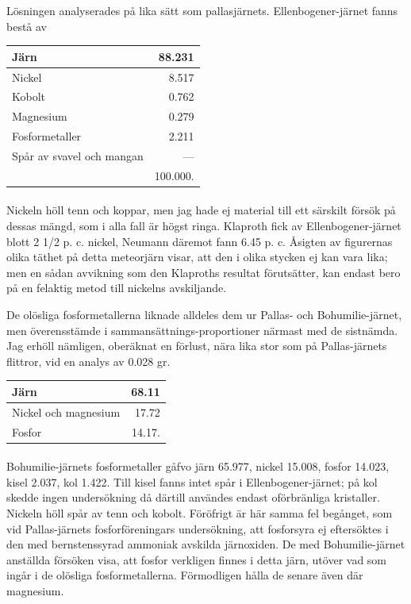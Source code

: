 \documentclass[a4paper, 12pt, oneside, swedish]{article}
\begin{document}
Lösningen analyserades på lika sätt som pallasjärnets. Ellenbogener-järnet fanns bestå av
\begin{table}[H]
    \centering\small
    \begin{tabular}{|l|r|}
    \hline
        Järn & 88.231 \\ \hline
        Nickel & 8.517 \\ \hline
        Kobolt & 0.762 \\ \hline
        Magnesium & 0.279 \\ \hline
        Fosformetaller & 2.211 \\ \hline
        Spår av svavel och mangan & --- \\ \hline
        ~ & 100.000. \\ \hline
    \end{tabular}
\end{table}
\paragraph{}
Nickeln höll tenn och koppar, men jag hade ej material till ett särskilt försök på dessas mängd, som i alla fall är högst ringa. Klaproth fick av Ellenbogener-järnet blott 2 1/2 p. c. nickel, Neumann däremot fann 6.45 p. c. Åsigten av figurernas olika täthet på detta meteorjärn visar, att den i olika stycken ej kan vara lika; men en sådan avvikning som den Klaproths resultat förutsätter, kan endast bero på en felaktig metod till nickelns avskiljande.

De olösliga fosformetallerna liknade alldeles dem ur Pallas- och Bohumilie-järnet, men överensstämde i sammansättnings-proportioner närmast med de sistnämda. Jag erhöll nämligen, oberäknat en förlust, nära lika stor som på Pallas-järnets flittror, vid en analys av 0.028 gr.
\begin{table}[H]
    \centering\small
    \begin{tabular}{|l|r|}
    \hline
        Järn & 68.11 \\ \hline
        Nickel och magnesium & 17.72 \\ \hline
        Fosfor & 14.17. \\ \hline
    \end{tabular}
\end{table}
\paragraph{}
Bohumilie-järnets fosformetaller gåfvo järn 65.977, nickel 15.008, fosfor 14.023, kisel 2.037, kol 1.422. Till kisel fanns intet spår i Ellenbogener-järnet; på kol skedde ingen undersökning då därtill användes endast oförbränliga kristaller. Nickeln höll spår av tenn och kobolt. Föröfrigt är här samma fel begånget, som vid Pallas-järnets fosforföreningars undersökning, att fosforsyra ej eftersöktes i den med bernstenssyrad ammoniak avskilda järnoxiden. De med Bohumilie-järnet anställda försöken visa, att fosfor verkligen finnes i detta järn, utöver vad som ingår i de olösliga fosformetallerna. Förmodligen hålla de senare även där magnesium.
\end{document}
